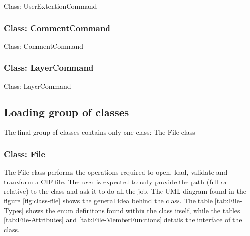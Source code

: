 \documentclass[11pt,twoside,openany,x11names,svgnames]{memoir}
\begin{document}
Class: UserExtentionCommand

\subsubsection{Class: CommentCommand}\label{Class-CommentCommand}

Class: CommentCommand

\subsubsection{Class: LayerCommand}\label{Class-LayerCommand}

Class: LayerCommand

\subsection{Loading group of classes}\label{Loading-group-of-classes}

The final group of classes contains only one class: The File class.

\subsubsection{Class: File}\label{Class-File}

The File class performs the operations required to open, load, validate and transform a CIF file. The user is expected to only provide the path (full or relative) to the class and ask it to do all the job. The UML diagram found in the figure \ref{fig:class-file} shows the general idea behind the class. The table \ref{tab:File-Types} shows the enum definitons found within the class itself, while the tables \ref{tab:File-Attributes} and \ref{tab:File-MemberFunctions} details the interface of the class.
\end{document}
